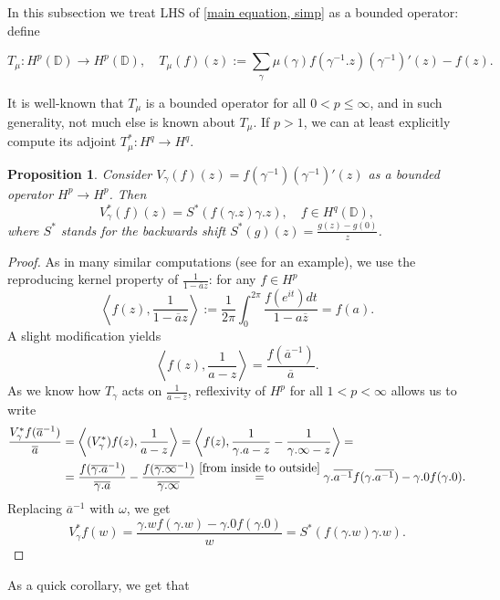 \documentclass[11pt]{article}
\newtheorem{proposition}{Proposition}[section]
\begin{document}
In this subsection we treat LHS of \eqref{main equation, simp} as a bounded operator: define

\[
T_\mu: H^p(\mathbb{D}) \rightarrow H^p(\mathbb{D}), \quad T_\mu(f)(z) := \sum_{\gamma} \mu(\gamma) f(\gamma^{-1}.z)(\gamma^{-1})'(z) - f(z).
\]

It is well-known that $T_\mu$ is a bounded operator for all $0 < p \le \infty$, and in such generality, not much else is known about $T_\mu$. If $p > 1$, we can at least explicitly compute its adjoint $T^*_\mu : H^q \rightarrow H^q$.

\begin{proposition}
	Consider $V_\gamma(f)(z) = f(\gamma^{-1})(\gamma^{-1})'(z)$ as a bounded operator $H^p \rightarrow H^p$. Then
	\[
	V^*_\gamma(f)(z) = S^*(f(\gamma.z) \gamma.z), \quad f \in H^q(\mathbb{D}),
	\]
	where $S^*$ stands for the backwards shift $S^*(g)(z) = \frac{g(z) - g(0)}{z}$.
\end{proposition}
\begin{proof}
	As in many similar computations (see \cite[Theorem 2]{cowen1988linear} for an example), we use the reproducing kernel property of $\frac{1}{1 - \overline{a}z}$: for any $f \in H^p$
	\[
	\left\langle f(z), \frac{1}{1 - \overline{a}z} \right\rangle := \frac{1}{2\pi} \int_{0}^{2 \pi} \frac{f(e^{it}) dt}{1 - a \overline{z}} = f(a).
 	\]
 	A slight modification yields
 	\[
 	\left\langle f(z), \frac{1}{a - z} \right\rangle = \frac{f(\overline{a}^{-1})}{\overline{a}}.
 	\]
 	As we know how $T_\gamma$ acts on $\frac{1}{a - z}$, reflexivity of $H^p$ for all $1 < p < \infty$ allows us to write
 	\[
 	\begin{aligned}
 		\frac{V^*_\gamma f(\overline{a}^{-1})}{\overline{a}} &= \left\langle (V_\gamma^*)f(z), \frac{1}{a - z} \right\rangle =  \left\langle f(z), \frac{1}{\gamma.a - z} - \frac{1}{\gamma.\infty - z} \right\rangle = \\ 
 		&=\frac{f(\overline{\gamma.a}^{-1})}{\overline{\gamma.a}} - \frac{f(\overline{\gamma.\infty}^{-1})}{\overline{\gamma.\infty}} \stackrel{\eqref{from inside to outside}}{=} \gamma.\overline{a^{-1}} f(\gamma.\overline{a^{-1}}) - \gamma.0 f(\gamma.0).
 	\end{aligned}
 	\]
 	Replacing $\overline{a}^{-1}$ with $\omega$, we get
 	\[
 	V^*_\gamma f(w) = \frac{\gamma.w f(\gamma.w) - \gamma.0 f(\gamma.0)}{w} = S^*(f(\gamma.w) \gamma.w).
 	\]
\end{proof}

As a quick corollary, we get that
\end{document}
